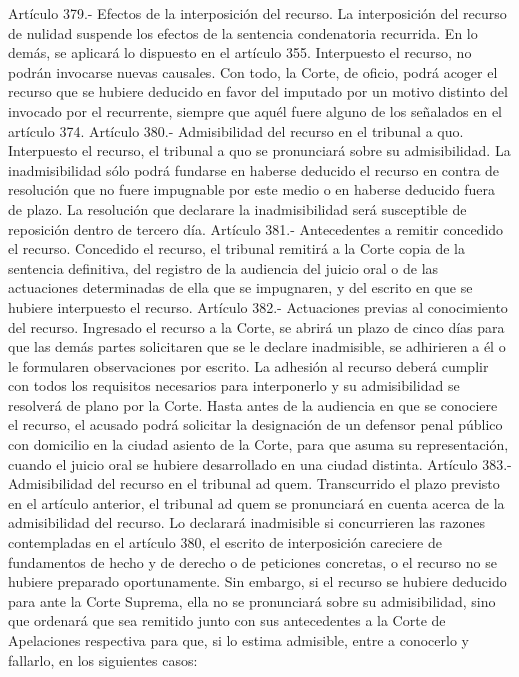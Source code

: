     Artículo 379.- Efectos de la interposición del recurso. La interposición del recurso de nulidad suspende los efectos de la sentencia condenatoria recurrida. En lo demás, se aplicará lo dispuesto en el artículo 355.
    Interpuesto el recurso, no podrán invocarse nuevas causales. Con todo, la Corte, de oficio, podrá acoger el recurso que se hubiere deducido en favor del imputado por un motivo distinto del invocado por el recurrente, siempre que aquél fuere alguno de los señalados en el artículo 374.
    Artículo 380.- Admisibilidad del recurso en el tribunal a quo. Interpuesto el recurso, el tribunal a quo se pronunciará sobre su admisibilidad.
    La inadmisibilidad sólo podrá fundarse en haberse deducido el recurso en contra de resolución que no fuere impugnable por este medio o en haberse deducido fuera de plazo.
    La resolución que declarare la inadmisibilidad será susceptible de reposición dentro de tercero día.
    Artículo 381.- Antecedentes a remitir concedido el recurso. Concedido el recurso, el tribunal remitirá a la Corte copia de la sentencia definitiva, del registro de la audiencia del juicio oral o de las actuaciones determinadas de ella que se impugnaren, y del escrito en que se hubiere interpuesto el recurso.
    Artículo 382.- Actuaciones previas al conocimiento del recurso. Ingresado el recurso a la Corte, se abrirá un plazo de cinco días para que las demás partes solicitaren que se le declare inadmisible, se adhirieren a él o le formularen observaciones por escrito.
    La adhesión al recurso deberá cumplir con todos los requisitos necesarios para interponerlo y su admisibilidad se resolverá de plano por la Corte.
    Hasta antes de la audiencia en que se conociere el recurso, el acusado podrá solicitar la designación de un defensor penal público con domicilio en la ciudad asiento de la Corte, para que asuma su representación, cuando el juicio oral se hubiere desarrollado en una ciudad distinta.
    Artículo 383.- Admisibilidad del recurso en el tribunal ad quem. Transcurrido el plazo previsto en el artículo anterior, el tribunal ad quem se pronunciará en cuenta acerca de la admisibilidad del recurso.
    Lo declarará inadmisible si concurrieren las razones contempladas en el artículo 380, el escrito de interposición careciere de fundamentos de hecho y de derecho o de peticiones concretas, o el recurso no se hubiere preparado oportunamente.
    Sin embargo, si el recurso se hubiere deducido para ante la Corte Suprema, ella no se pronunciará sobre su admisibilidad, sino que ordenará que sea remitido junto con sus antecedentes a la Corte de Apelaciones respectiva para que, si lo estima admisible, entre a conocerlo y fallarlo, en los siguientes casos:

